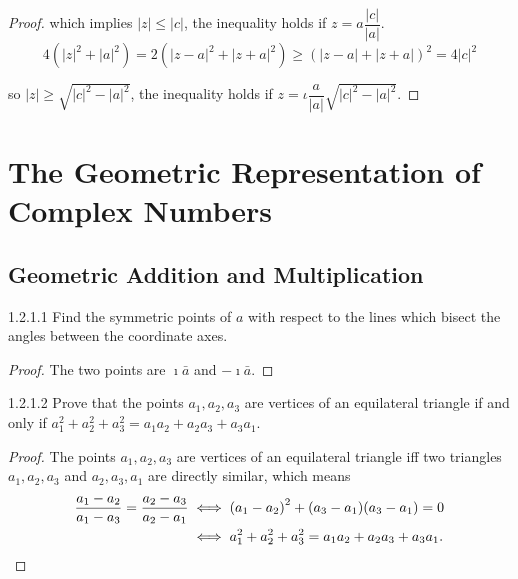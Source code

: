 \begin{proof}
	which implies \( \left\vert z \right\vert \le \left\vert c \right\vert \), the inequality holds if \( z = a\dfrac{\left\vert c\right\vert}{\left\vert a\right\vert} \).
	\[
		4({\left\vert z \right\vert}^{2} + {\left\vert a \right\vert}^{2}) = 2({\left\vert z - a \right\vert}^{2} + {\left\vert z + a \right\vert}^{2}) \ge {(\left\vert z - a\right\vert + \left\vert z + a\right\vert)}^{2} = 4{\left\vert c \right\vert}^{2}
	\]

	so \( \left\vert z \right\vert \ge \sqrt{{\left\vert c\right\vert}^{2} - {\left\vert a\right\vert}^{2}} \), the inequality holds if \( z = \iota\dfrac{a}{\left\vert a \right\vert}\sqrt{{\left\vert c\right\vert}^{2} - {\left\vert a\right\vert}^{2}} \).
\end{proof}

\section{The Geometric Representation of Complex Numbers}

\subsection{Geometric Addition and Multiplication}

\begin{problem}{1.2.1.1}
Find the symmetric points of \(a\) with respect to the lines which bisect the angles between the coordinate axes.
\end{problem}

\begin{proof}
	The two points are \( \imath\bar{a} \) and \( -\imath\bar{a} \).
\end{proof}

\begin{problem}{1.2.1.2}
Prove that the points \( a_{1}, a_{2}, a_{3} \) are vertices of an equilateral triangle if and only if \( a_{1}^{2} + a_{2}^{2} + a_{3}^{2} = a_{1}a_{2} + a_{2}a_{3} + a_{3}a_{1} \).
\end{problem}

\begin{proof}
	The points \( a_{1}, a_{2}, a_{3} \) are vertices of an equilateral triangle iff two triangles \( a_{1}, a_{2}, a_{3} \) and \( a_{2}, a_{3}, a_{1} \) are directly similar, which means
	\begingroup
	\allowdisplaybreaks%
	\begin{align*}
		\dfrac{a_{1} - a_{2}}{a_{1} - a_{3}} = \dfrac{a_{2} - a_{3}}{a_{2} - a_{1}} & \iff {(a_{1} - a_{2})}^{2} + (a_{3} - a_{1})(a_{3} - a_{1}) = 0                        \\
		                                                                            & \iff a_{1}^{2} + a_{2}^{2} + a_{3}^{2} = a_{1}a_{2} + a_{2}a_{3} + a_{3}a_{1}.\qedhere
	\end{align*}
	\endgroup
\end{proof}

